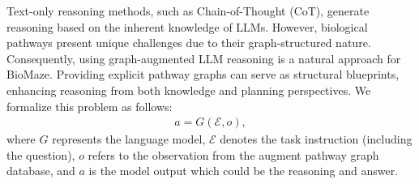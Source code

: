 






Text-only reasoning methods, such as Chain-of-Thought (CoT), generate reasoning based on the inherent knowledge of LLMs. However, biological pathways present unique challenges due to their graph-structured nature. Consequently, using graph-augmented LLM reasoning is a natural approach for BioMaze. Providing explicit pathway graphs can serve as structural blueprints, enhancing reasoning from both knowledge and planning perspectives. We formalize this problem as follows:
\begin{equation}
\begin{aligned}
a = G (\mathcal{E}, o),
\end{aligned}
\end{equation}
where $G$ represents the language model, $\mathcal{E}$ denotes the task instruction (including the question), $o$ refers to the observation from the augment pathway graph database, and $a$ is the model output which could be the reasoning and answer.

